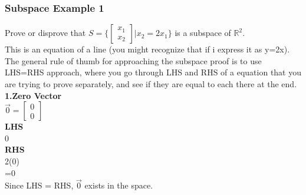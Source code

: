 \documentclass[12pt]{article}
\newcommand{\R}{\mathbb{R}}
\begin{document}
\subsubsection{Subspace Example 1}
Prove or disprove that $S=\{\begin{bmatrix}x_1\\x_2\end{bmatrix} | x_2 = 2x_1\}$ is a subspace of $\R^2$.\\
This is an equation of a line (you might recognize that if i express it as y=2x).\\
The general rule of thumb for approaching the subspace proof is to use LHS=RHS approach, where you go through LHS and RHS of a equation that you are trying to prove separately, and see if they are equal to each there at the end.\\
\textbf{1.Zero Vector}\\
$\vec{0} = \begin{bmatrix}0\\0\end{bmatrix}$\\
\textbf{LHS}\\
0\\
\textbf{RHS}\\
2(0)\\
=0\\
Since LHS = RHS, $\vec{0}$ exists in the space.\\
\end{document}
